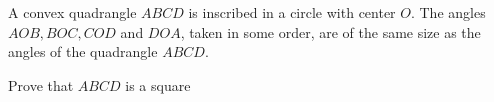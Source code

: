 A convex quadrangle $ ABCD$ is inscribed in a circle with center $ O$. The angles $ AOB, BOC, COD$ and $ DOA$,  taken in some order, are of the same size as the angles of the quadrangle $ ABCD$.

Prove that $ ABCD$ is a square